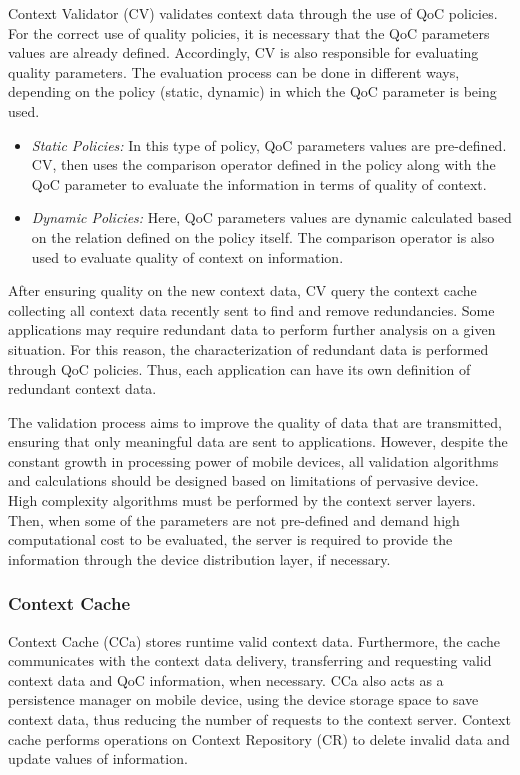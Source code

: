 \documentclass[letterpaper,conference]{IEEEtran}
\begin{document}
Context Validator (CV) validates context data through the use of QoC policies. For the 
correct use of quality policies, it is necessary that the QoC parameters values are 
already defined. Accordingly, CV is also responsible for evaluating quality parameters. 
The evaluation process can be done in different ways, depending on the policy (static, 
dynamic) in which the QoC parameter is being used.

\begin{itemize}
 \item \textit{Static Policies:}  In this type of policy, QoC parameters values are 
				   pre-defined. CV, then uses the comparison operator 
				   defined in the policy along with the QoC parameter to 
				   evaluate the information in terms of quality of 
				   context.
 \item \textit{Dynamic Policies:} Here, QoC parameters values are dynamic calculated 
				   based on the relation defined on the policy itself. 
				   The comparison operator is also used to evaluate 
				   quality of context on information.
\end{itemize}

 After ensuring quality on the new context data, CV query the context cache collecting 
 all context data recently sent to find and remove redundancies. Some applications may 
 require redundant data to perform further analysis on a given situation. For this 
 reason, the characterization of redundant data is performed through QoC policies. Thus,
 each application can have its own definition of redundant context data.

 The validation process aims to improve the quality of data that are transmitted, 
 ensuring that only meaningful data are sent to applications. However, despite the 
 constant growth in processing power of mobile devices, all validation algorithms and 
 calculations should be designed based on limitations of pervasive device. High 
 complexity algorithms must be performed by the context server layers. Then, when some 
 of the parameters are not pre-defined and demand high computational cost to be 
 evaluated, the server is required to provide the information through the device 
 distribution layer, if necessary.

\subsubsection{Context Cache}
 
 Context Cache (CCa) stores runtime valid context data. Furthermore, the cache 
 communicates with the context data delivery, transferring and requesting valid 
 context data and QoC information, when necessary. CCa also acts as a persistence 
 manager on mobile device, using the device storage space to save context data, thus 
 reducing the number of requests to the context server. Context cache performs 
 operations on Context Repository (CR) to delete invalid data and update values of 
 information.
 
\end{document}
